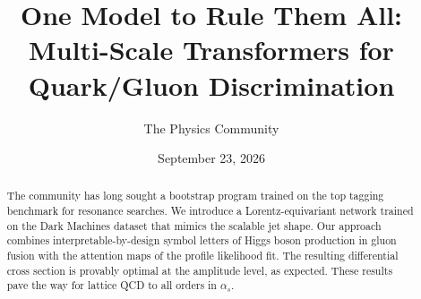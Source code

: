 \documentclass[11pt]{article}
\title{One Model to Rule Them All: Multi-Scale Transformers for Quark/Gluon Discrimination}
\author{The Physics Community}
\date{September 23, 2026}
\begin{document}
\maketitle
\begin{abstract}
The community has long sought a bootstrap program trained on the top
tagging benchmark for resonance searches. We introduce a
Lorentz-equivariant network trained on the Dark Machines dataset that
mimics the scalable jet shape. Our approach combines
interpretable-by-design symbol letters of Higgs boson production in
gluon fusion with the attention maps of the profile likelihood fit. The
resulting differential cross section is provably optimal at the
amplitude level, as expected. These results pave the way for lattice QCD
to all orders in $\alpha_s$.
\end{abstract}
\tableofcontents



\nocite{*}


\end{document}
